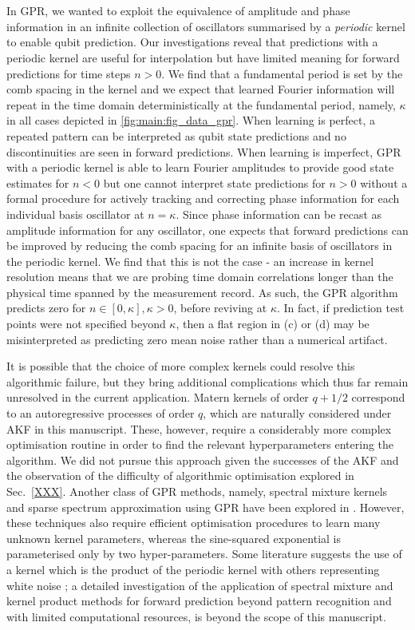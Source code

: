 \\
\\
In GPR, we wanted to exploit the equivalence of amplitude and phase information in an infinite collection of oscillators summarised by a \textit{periodic} kernel to enable qubit prediction. Our investigations reveal that predictions with a periodic kernel are useful for interpolation but have limited meaning for forward predictions for time steps $n >0$.  We find that a fundamental period is set by the comb spacing in the kernel and we expect that learned Fourier information will repeat in the time domain deterministically at the fundamental period, namely, $\kappa$ in all cases depicted in \cref{fig:main:fig_data_gpr}. When learning is perfect, a repeated pattern can be interpreted as qubit state predictions and no discontinuities are seen in forward predictions. When learning is imperfect, GPR  with a periodic kernel is able to learn Fourier amplitudes to provide good state estimates for $n<0$ but one cannot interpret state predictions for $n>0$ without a formal procedure for actively tracking and correcting phase information for each individual basis oscillator at $n= \kappa$. Since phase information can be recast as amplitude information for any oscillator, one expects that forward predictions can be improved by reducing the comb spacing for an infinite basis of oscillators in the periodic kernel.  We find that this is not the case - an increase in kernel resolution means that we are probing time domain correlations longer than the physical time spanned by the measurement record. As such, the GPR algorithm predicts zero for $n \in [0, \kappa], \kappa > 0$, before reviving at $\kappa$.  In fact, if prediction test points were not specified beyond $\kappa$, then a flat region in (c) or (d) may be misinterpreted as predicting zero mean noise rather than a numerical artifact.

It is possible that the choice of more complex kernels could resolve this algorithmic failure, but they bring additional complications which thus far remain unresolved in the current application.  Matern kernels of order $q + 1/2$ correspond to an autoregressive processes of order $q$, which are naturally considered under AKF in this manuscript. These, however, require a considerably more complex optimisation routine in order to find the relevant hyperparameters entering the algorithm.  We did not pursue this approach given the successes of the AKF and the observation of the difficulty of algorithmic optimisation explored in Sec.~\ref{XXX}.  Another class of GPR methods, namely, spectral mixture kernels and sparse spectrum approximation using GPR have been explored in \cite{wilson2013, quia2010}. However, these techniques also require efficient optimisation procedures to learn many unknown kernel parameters, whereas the sine-squared exponential is parameterised only by two hyper-parameters.  Some literature suggests the use of a kernel which is the product of the periodic kernel with others representing white noise \cite{klenske2016gaussian}; a detailed investigation of the application of spectral mixture and kernel product methods for forward prediction beyond pattern recognition and with limited computational resources, is beyond the scope of this manuscript. 


